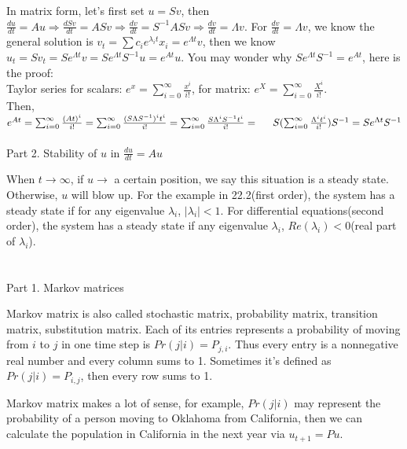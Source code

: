 \documentclass{article}
\begin{document}
\begin{spacing}{1.5}
In matrix form, let's first set $u=Sv$, then $\frac{du}{dt}=Au \Rightarrow \frac{dSv}{dt}=ASv \Rightarrow \frac{dv}{dt}=S^{-1}ASv \Rightarrow \frac{dv}{dt}=
\Lambda v$. For $\frac{dv}{dt}=\Lambda v$, we know the general solution is $v_t=\sum c_i e^{\lambda_i t} x_i=e^{\Lambda t}v$, then we know $u_t=Sv_t=Se^{\Lambda t}v=Se^{\Lambda t}S^{-1}u=e^{At}u$. You may wonder why $Se^{\Lambda t}S^{-1}=e^{At}$, here is the proof:\\
\hspace*{0.5cm}Taylor series for scalars: $e^x=\sum_{i=0}^{\infty}\frac{x^i}{i!}$, for matrix: $e^X=\sum_{i=0}^{\infty}\frac{X^i}{i!}$.\\
\hspace*{0.5cm}Then, $e^{At}=\sum_{i=0}^{\infty}\frac{(At)^i}{i!} = \sum_{i=0}^{\infty}\frac{(S\Lambda S^{-1})^it^i}{i!} =  
\sum_{i=0}^{\infty}\frac{S\Lambda^iS^{-1}t^i}{i!} = \\
\hspace*{0.5cm}S (\sum_{i=0}^{\infty}\frac{\Lambda^it^i}{i!}) S^{-1} =
Se^{\Lambda t}S^{-1}$
\\\\Part 2. Stability of $u$ in $\frac{du}{dt}=Au$

When $t \rightarrow \infty$, if $u \rightarrow$ a certain position, we say this situation is a steady state. Otherwise, $u$ will blow up. For the example in 22.2(first order), the system has a steady state if for any eigenvalue $\lambda_i$, $|\lambda_i|<1$. For differential equations(second order), the system has a steady state if any eigenvalue $\lambda_i$, $Re(\lambda_i)<0$(real part of $\lambda_i$). 


\section{}
Part 1. Markov matrices

Markov matrix is also called stochastic matrix, probability matrix, transition matrix, substitution matrix. Each of its entries represents a probability of moving from $i$ to $j$ in one time step is $Pr(j|i)=P_{j, i}$. Thus every entry is a nonnegative real number and every column sums to 1. Sometimes it's defined as $Pr(j|i)=P_{i, j}$, then every row sums to 1. 

Markov matrix makes a lot of sense, for example, $Pr(j|i)$ may represent the probability of a person moving to Oklahoma from California, then we can calculate the population in California in the next year via $u_{t+1}=Pu$.


\end{spacing}
\end{document}
